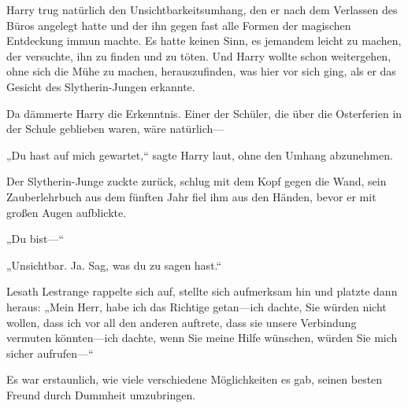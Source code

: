 Harry trug natürlich den Unsichtbarkeitsumhang, den er nach dem Verlassen des Büros angelegt hatte und der ihn gegen fast alle Formen der magischen Entdeckung immun machte. Es hatte keinen Sinn, es jemandem leicht zu machen, der versuchte, ihn zu finden und zu töten. Und Harry wollte schon weitergehen, ohne sich die Mühe zu machen, herauszufinden, was hier vor sich ging, als er das Gesicht des Slytherin-Jungen erkannte.

Da dämmerte Harry die Erkenntnis. Einer der Schüler, die über die Osterferien in der Schule geblieben waren, wäre natürlich—

„Du hast auf mich gewartet,“ sagte Harry laut, ohne den Umhang abzunehmen.

Der Slytherin-Junge zuckte zurück, schlug mit dem Kopf gegen die Wand, sein Zauberlehrbuch aus dem fünften Jahr fiel ihm aus den Händen, bevor er mit großen Augen aufblickte.

„Du bist—“

„Unsichtbar. Ja. Sag, was du zu sagen hast.“

Lesath Lestrange rappelte sich auf, stellte sich aufmerksam hin und platzte dann heraus: „Mein Herr, habe ich das Richtige getan—ich dachte, Sie würden nicht wollen, dass ich vor all den anderen auftrete, dass sie unsere Verbindung vermuten könnten—ich dachte, wenn Sie meine Hilfe wünschen, würden Sie mich sicher aufrufen—“

Es war erstaunlich, wie viele verschiedene Möglichkeiten es gab, seinen besten Freund durch Dummheit umzubringen.

